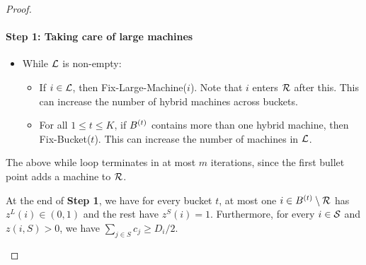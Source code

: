 \begin{proof}
   \paragraph{Step 1: Taking care of large machines}
   \begin{itemize}[noitemsep]
   	\item[] While ${\cal L}$ is non-empty: 
   	\begin{itemize}[noitemsep]
   		\item If $i\in {\cal L}$, then {\sf Fix-Large-Machine}($i$). Note that $i$ enters ${\cal R}$ after this. This can increase the number of hybrid machines across buckets.
   		\item For all $1\leq t\leq K$, if $B^{(t)}$ contains more than one hybrid machine, then {\sf Fix-Bucket}($t$). This can increase the number of machines in ${\cal L}$.
   	\end{itemize}
   \end{itemize}
   The above while loop terminates in at most $m$ iterations, since the first bullet point adds a machine to ${\cal R}$.
%   
   \begin{claim}\label{clm:003}
   	At the end of {\bf Step 1}, we have for every bucket $t$, at most one  $i\in B^{(t)}\setminus{\cal R}$ has $z^L(i) \in (0,1)$ and the rest have $z^S(i) = 1$. Furthermore, for every $i\in {\cal S}$ and $z(i,S) > 0$, 
   	we have $\sum_{j\in S} c_j \geq D_i/2$.
   	\end{claim}
   	

   
   

\end{proof}
